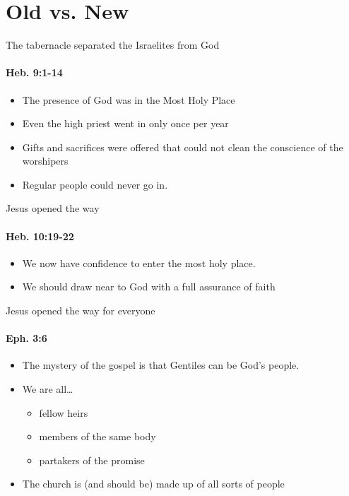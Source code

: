 \section{Old vs. New}

\begin{frame}{The tabernacle separated the Israelites from God}
\framesubtitle{Heb. 9:1-14}

\begin{itemize}
	\item The presence of God was in the Most Holy Place
	\item Even the high priest went in only once per year
	\item Gifts and sacrifices were offered that could not clean the conscience of the worshipers
	\item Regular people could never go in.
\end{itemize}

\end{frame}

\begin{frame}{Jesus opened the way}
\framesubtitle{Heb. 10:19-22}

\begin{itemize}
	\item We now have confidence to enter the most holy place.
	\item We should draw near to God with a full assurance of faith
\end{itemize}

\end{frame}

\begin{frame}{Jesus opened the way for everyone}
\framesubtitle{Eph. 3:6}

\begin{itemize}
	\item The mystery of the gospel is that Gentiles can be God's people.
	\item We are all\ldots
	\begin{itemize}
		\item fellow heirs
		\item members of the same body
		\item partakers of the promise
	\end{itemize}
	\item The church is (and should be) made up of all sorts of people
\end{itemize}

\end{frame}

